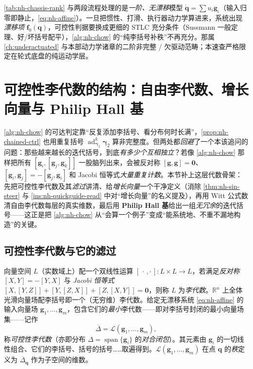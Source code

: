 \begin{pitfall}\label{pit:nh-quickguide-scope}
\cref{tab:nh-chassis-rank} 与两段流程处理的是\emph{一阶、无漂移}模型 $\dot{\mathbf{q}}=\sum u_i\mathbf{g}_i$（输入归零即静止，\cref{eq:nh-affine}）。一旦把惯性、打滑、执行器动力学算进来，系统出现\emph{漂移项} $\mathbf{f}_0(\mathbf{q})$，可控性判据要换成更细的 STLC 充分条件（Sussmann 一般定理、好/坏括号配平），\cref{alg:nh-chow} 的“纯李括号补秩”不再充分。那属\cref{ch:underactuated} 与本部动力学诸章的二阶非完整 / 欠驱动范畴；本速查严格限定在轮式底盘的纯运动学层。
\end{pitfall}

\section{可控性李代数的结构：自由李代数、增长向量与 Philip Hall 基}
\label{sec:nh-lie-structure}

\cref{alg:nh-chow} 的可达判定靠“反复添加李括号、看分布何时长满”，\cref{prop:nh-chained-ctrl} 也用重复括号 $\operatorname{ad}_{\boldsymbol{\gamma}_1}^k\boldsymbol{\gamma}_2$ 算非完整度。但两处都\emph{回避}了一个本该追问的问题：那些越来越长的迭代括号，到底\emph{有多少个互相独立}？若像 \cref{alg:nh-chow} 那样把所有 $[\mathbf{g}_i,[\mathbf{g}_j,\mathbf{g}_k]]$ 一股脑列出来，会被反对称 $[\mathbf{g},\mathbf{g}]=\mathbf 0$、$[\mathbf{g}_i,\mathbf{g}_j]=-[\mathbf{g}_j,\mathbf{g}_i]$ 和 Jacobi 恒等式\emph{大量重复计数}。本节补上这层代数骨架：先把可控性李代数及其\emph{滤过}讲清、给\emph{增长向量}一个干净定义（消除 \cref{thm:nh-sin-steer} 与 \cref{ins:nh-quickguide-read} 中对“增长向量”的名义提及），再用 Witt 公式数清自由李代数每层的真实维数，最后用 \textbf{Philip Hall 基}给出一组\emph{无冗余}的迭代括号——这正是把 \cref{alg:nh-chow} 从“会算一个例子”变成“能系统地、不重不漏地构造”的关键\cite{murray1994mathematical}。

\subsection{可控性李代数与它的滤过}
\label{sec:nh-ctrl-lie}

\begin{definition}[李代数与可控性李代数]\label{def:nh-ctrl-lie}
向量空间 $L$（实数域上）配一个双线性运算 $[\,\cdot\,,\cdot\,]:L\times L\to L$，若满足\emph{反对称} $[X,Y]=-[Y,X]$ 与 \emph{Jacobi 恒等式} $[X,[Y,Z]]+[Y,[Z,X]]+[Z,[X,Y]]=\mathbf 0$，则称 $L$ 为\emph{李代数}。$\mathbb{R}^n$ 上全体光滑向量场配李括号即一个（无穷维）李代数。给定无漂移系统 \cref{eq:nh-affine} 的输入向量场 $\mathbf{g}_1,\dots,\mathbf{g}_m$，包含它们的\emph{最小}李代数——即对李括号封闭的最小向量场集——记作
\begin{equation}
  \overline{\Delta}=\mathcal{L}(\mathbf{g}_1,\dots,\mathbf{g}_m),
  \label{eq:nh-ctrl-lie}
\end{equation}
称\emph{可控性李代数}（亦即分布 $\Delta=\operatorname{span}\{\mathbf{g}_i\}$ 的\emph{对合闭包}）。其元素由 $\mathbf{g}_i$ 的一切线性组合、它们的李括号、括号的括号……取遍得到。$\mathcal{L}(\mathbf{g}_1,\dots,\mathbf{g}_m)$ 在点 $\mathbf{q}$ 的\emph{秩}定义为 $\overline{\Delta}_{\mathbf{q}}$ 作为子空间的维数。
\end{definition}

